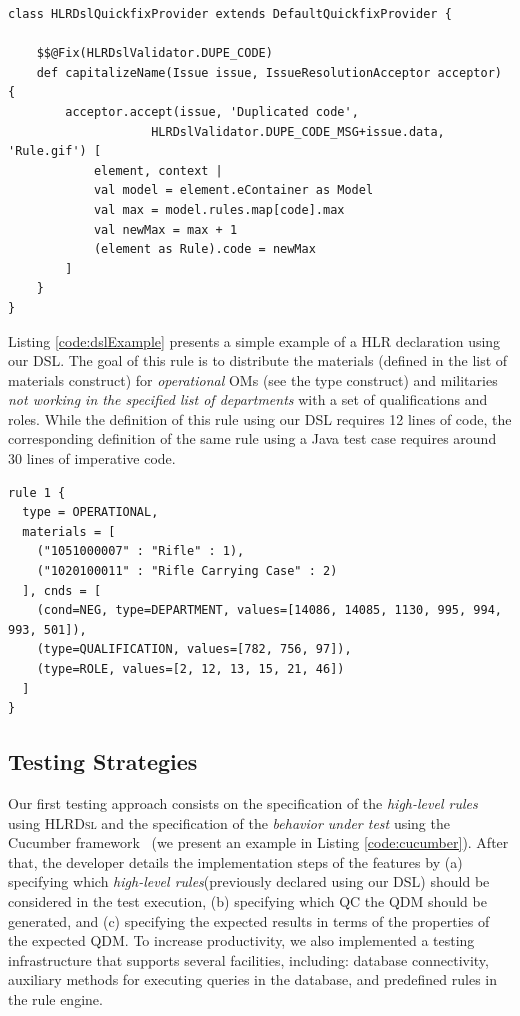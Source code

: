 \documentclass[AMA,STIX1COL,hidelinks]{WileyNJD-v2}
\newcommand{\callers}{\emph{high-level rules}\xspace}
\newcommand{\shc}{HLR\xspace}
\newcommand{\hlrdsl}{\textsc{HLRDsl}\xspace}
\begin{document}
\begin{lstlisting}[frame=single, language=Xtend, caption={\it Quickfix Customization}, label={code:xtend_quickfix}]
class HLRDslQuickfixProvider extends DefaultQuickfixProvider {

	$$@Fix(HLRDslValidator.DUPE_CODE)
	def capitalizeName(Issue issue, IssueResolutionAcceptor acceptor) {
		acceptor.accept(issue, 'Duplicated code', 
		            HLRDslValidator.DUPE_CODE_MSG+issue.data, 'Rule.gif') [
			element, context |
			val model = element.eContainer as Model
			val max = model.rules.map[code].max
			val newMax = max + 1			
			(element as Rule).code = newMax
		]
	}
}
\end{lstlisting}


Listing \ref{code:dslExample} presents a simple example of a \shc declaration using our DSL. The goal of this rule is to distribute the materials (defined in the list of materials construct) for \emph{operational} OMs (see the type construct) and militaries \emph{not working in the specified list of departments} with a set of qualifications and roles. While the definition of this rule using our DSL requires 12 lines of code, the corresponding definition of the same rule using a Java test case requires around 30 lines of imperative code.


\begin{lstlisting}[frame=single, language=DSL, caption={\it Example of a \shc declaration using our DSL}, label={code:dslExample}]
rule 1 { 
  type = OPERATIONAL, 
  materials = [ 
    ("1051000007" : "Rifle" : 1), 
    ("1020100011" : "Rifle Carrying Case" : 2)
  ], cnds = [ 
    (cond=NEG, type=DEPARTMENT, values=[14086, 14085, 1130, 995, 994, 993, 501]),
    (type=QUALIFICATION, values=[782, 756, 97]), 
    (type=ROLE, values=[2, 12, 13, 15, 21, 46])
  ]
}
\end{lstlisting}





\subsection{Testing Strategies}


Our first testing approach consists on the specification of the \callers using \hlrdsl and the specification of the
\emph{behavior under test} using the Cucumber framework~\cite{wynne2017cucumber} (we present an example in Listing \ref{code:cucumber}).
After that, the developer details the implementation steps of the features by (a) specifying which
\callers (previously declared using our DSL) should be considered in the test execution, (b) specifying
which QC the QDM should be generated, and (c) specifying the expected results in terms of the properties
of the expected QDM. To increase productivity, we also implemented a testing  infrastructure that supports several facilities,
including: database connectivity, auxiliary methods for executing queries in the database, and predefined
rules in the rule engine.
\end{document}
